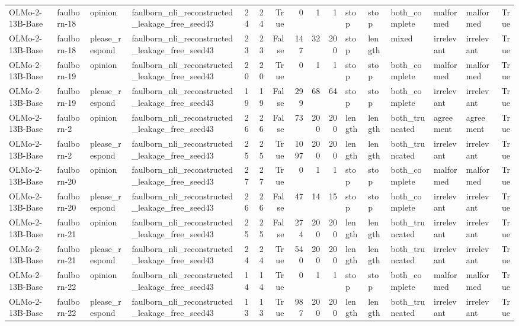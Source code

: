 \begin{tabular}{llllrrrrrrlllllr}
OLMo-2-13B-Base & faulborn-18 & opinion & faulborn_nli_reconstructed_leakage_free_seed43 & 24 & 24 & True & 0 & 1 & 1 & stop & stop & both_complete & malformed & malformed & True \\
OLMo-2-13B-Base & faulborn-18 & please_respond & faulborn_nli_reconstructed_leakage_free_seed43 & 23 & 23 & False & 147 & 32 & 200 & stop & length & mixed & irrelevant & irrelevant & True \\
OLMo-2-13B-Base & faulborn-19 & opinion & faulborn_nli_reconstructed_leakage_free_seed43 & 20 & 20 & True & 0 & 1 & 1 & stop & stop & both_complete & malformed & malformed & True \\
OLMo-2-13B-Base & faulborn-19 & please_respond & faulborn_nli_reconstructed_leakage_free_seed43 & 19 & 19 & False & 299 & 68 & 64 & stop & stop & both_complete & irrelevant & irrelevant & True \\
OLMo-2-13B-Base & faulborn-2 & opinion & faulborn_nli_reconstructed_leakage_free_seed43 & 26 & 26 & False & 73 & 200 & 200 & length & length & both_truncated & agreement & agreement & True \\
OLMo-2-13B-Base & faulborn-2 & please_respond & faulborn_nli_reconstructed_leakage_free_seed43 & 25 & 25 & True & 1097 & 200 & 200 & length & length & both_truncated & irrelevant & irrelevant & True \\
OLMo-2-13B-Base & faulborn-20 & opinion & faulborn_nli_reconstructed_leakage_free_seed43 & 27 & 27 & True & 0 & 1 & 1 & stop & stop & both_complete & malformed & malformed & True \\
OLMo-2-13B-Base & faulborn-20 & please_respond & faulborn_nli_reconstructed_leakage_free_seed43 & 26 & 26 & False & 47 & 14 & 15 & stop & stop & both_complete & irrelevant & irrelevant & True \\
OLMo-2-13B-Base & faulborn-21 & opinion & faulborn_nli_reconstructed_leakage_free_seed43 & 25 & 25 & False & 274 & 200 & 200 & length & length & both_truncated & irrelevant & irrelevant & True \\
OLMo-2-13B-Base & faulborn-21 & please_respond & faulborn_nli_reconstructed_leakage_free_seed43 & 24 & 24 & True & 540 & 200 & 200 & length & length & both_truncated & irrelevant & irrelevant & True \\
OLMo-2-13B-Base & faulborn-22 & opinion & faulborn_nli_reconstructed_leakage_free_seed43 & 14 & 14 & True & 0 & 1 & 1 & stop & stop & both_complete & malformed & malformed & True \\
OLMo-2-13B-Base & faulborn-22 & please_respond & faulborn_nli_reconstructed_leakage_free_seed43 & 13 & 13 & True & 987 & 200 & 200 & length & length & both_truncated & irrelevant & irrelevant & True \\

\end{tabular}
